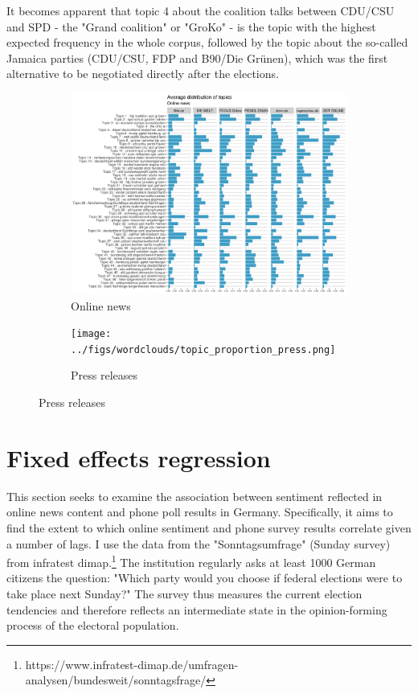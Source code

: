 \documentclass[12pt,a4paper,notitlepage]{article}
\begin{document}
It becomes apparent that topic 4 about the coalition talks between CDU/CSU and SPD - the "Grand coalition" or "GroKo" - is the topic with the highest expected frequency in the whole corpus, followed by the topic about the so-called Jamaica parties (CDU/CSU, FDP and B90/Die Grünen), which was the first alternative to be negotiated directly after the elections.  

\begin{figure}[H]\label{fig_wordcloud2}
	\caption{Expected frequency}
	\begin{center}
		\begin{subfigure}[normla]{0.48\textwidth}
			\includegraphics[width=\textwidth]{../figs/topic_proportion_news.png}
			\caption{Online news}
		\end{subfigure}
		\begin{subfigure}[normla]{0.48\textwidth}
			\texttt{[image: ../figs/wordclouds/topic\_proportion\_press.png]}
			\caption{Press releases}
		\end{subfigure}
	\end{center}
\end{figure}


\section{Fixed effects regression}\label{ch_regression}

This section seeks to examine the association between sentiment reflected in online news content and phone poll results in Germany. Specifically, it aims to find the extent to which online sentiment and phone survey results correlate given a number of lags. I use the data from the "Sonntagsumfrage" (Sunday survey) from infratest dimap.\footnote{https://www.infratest-dimap.de/umfragen-analysen/bundesweit/sonntagsfrage/} The institution regularly asks at least 1000 German citizens the question: "Which party would you choose if federal elections were to take place next Sunday?" The survey thus measures the current election tendencies and therefore reflects an intermediate state in the opinion-forming process of the electoral population.
\end{document}
